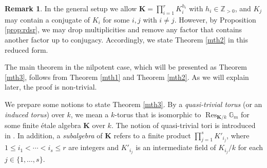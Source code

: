 \documentclass[12pt]{amsart}
\theoremstyle{plain}
\theoremstyle{definition}
\newtheorem{rem}[thm]{Remark}
\numberwithin{thm}{section}
\numberwithin{equation}{section}
\newcommand{\G}{\mathbb{G}}
\newcommand{\bK}{\mathbf{K}}
\DeclareMathOperator{\Res}{Res}
\begin{document}
\begin{rem}
In the general setup we allow $\bK=\prod_{i=1}^{r} K_i^{h_i}$ with $h_i\in\mathbb{Z}_{>0}$, and $K_{j}$ may contain a conjugate of $K_{i}$ for some $i,j$ with $i\neq j$.
However, by Proposition \ref{prop:rdsr}, we may drop multiplicities and remove any factor that contains another factor up to conjugacy. 
Accordingly, we state Theorem \ref{mth2} in this reduced form.
\end{rem}

The main theorem in the nilpotent case, which will be presented as Theorem \ref{mth3}, follows from Theorem \ref{mth1} and Theorem \ref{mth2}. As we will explain later, the proof is non-trivial.

We prepare some notions to state Theorem \ref{mth3}. By a \emph{quasi-trivial torus} (or an \emph{induced torus}) over $k$, we mean a $k$-torus that is isomorphic to $\Res_{\bK/k}\G_{m}$ for some finite {\'e}tale algebra $\bK$ over $k$. The notion of quasi-trivial tori is introduced in \cite[\S2, p.~187]{ColliotThelene1977}. 
In addition, a \emph{subalgebra} of $\bK$ refers to a finite product $\prod_{j=1}^{s}K'_{i_{j}}$, where $1\leq i_{1}<\cdots<i_{s}\leq r$ are integers and $K'_{i_{j}}$ is an intermediate field of $K_{i_{j}}/k$ for each $j\in \{1,\ldots,s\}$.
\end{document}
